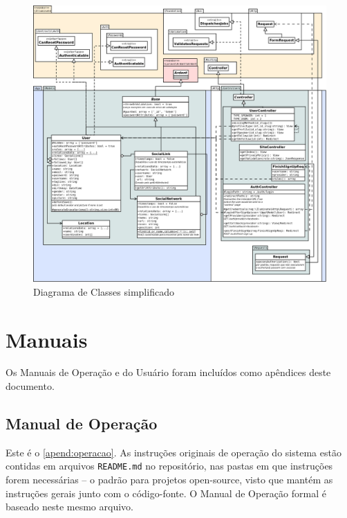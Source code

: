 \documentclass[12pt,a4paper,twoside,hyphens,english,brazil]{abntex2}
\begin{document}
{\begin{figure}[h!]
	\centering
	\includegraphics[width=1\linewidth]{diagramas/classes.png}
	\caption{Diagrama de Classes simplificado}
\end{figure}





\section{Manuais}
Os Manuais de Operação e do Usuário foram incluídos como apêndices deste documento.

\subsection{Manual de Operação}
Este é o \autoref{apend:operacao}. As instruções originais de operação do sistema estão contidas em arquivos \texttt{README.md} no repositório, nas pastas em que instruções forem necessárias -- o padrão para projetos open-source, visto que mantém as instruções gerais junto com o código-fonte. O Manual de Operação formal é baseado neste mesmo arquivo.

}
\end{document}
